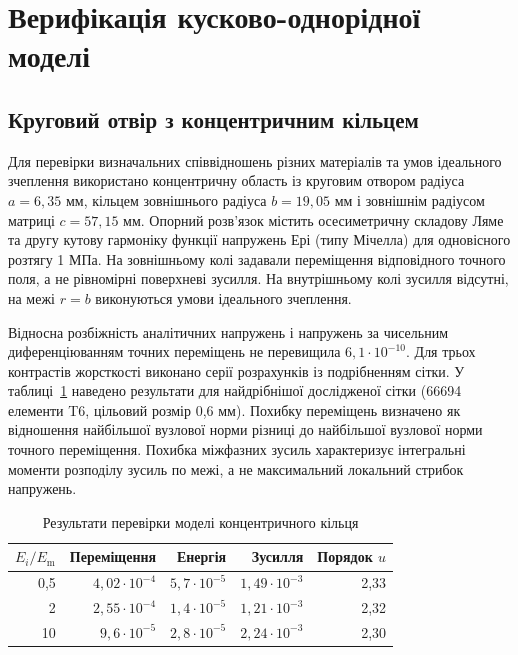 \section{Верифікація кусково-однорідної моделі}
\label{sec:ver-phase}

\subsection{Круговий отвір з концентричним кільцем}

Для перевірки визначальних співвідношень різних матеріалів та умов ідеального зчеплення використано концентричну область із круговим отвором радіуса $a=6{,}35$ мм, кільцем зовнішнього радіуса $b=19{,}05$ мм і зовнішнім радіусом матриці $c=57{,}15$ мм. Опорний розв'язок містить осесиметричну складову Ляме та другу кутову гармоніку функції напружень Ері (типу Мічелла) для одновісного розтягу 1 МПа. На зовнішньому колі задавали переміщення відповідного точного поля, а не рівномірні поверхневі зусилля. На внутрішньому колі зусилля відсутні, на межі $r=b$ виконуються умови ідеального зчеплення.

Відносна розбіжність аналітичних напружень і напружень за чисельним диференціюванням точних переміщень не перевищила $6{,}1\cdot10^{-10}$. Для трьох контрастів жорсткості виконано серії розрахунків із подрібненням сітки. У таблиці~\ref{tab:ver-coated} наведено результати для найдрібнішої дослідженої сітки (66694 елементи T6, цільовий розмір 0,6 мм). Похибку переміщень визначено як відношення найбільшої вузлової норми різниці до найбільшої вузлової норми точного переміщення. Похибка міжфазних зусиль характеризує інтегральні моменти розподілу зусиль по межі, а не максимальний локальний стрибок напружень.

\begin{table}[htbp]
 \centering
 \caption{Результати перевірки моделі концентричного кільця}
 \label{tab:ver-coated}
 \begin{tabular}{rrrrr}
 \toprule
 $E_i/E_{\mathrm m}$ & Переміщення & Енергія & Зусилля & Порядок $u$\\
 \midrule
 0,5 & $4,02\cdot10^{-4}$ & $5,7\cdot10^{-5}$ & $1,49\cdot10^{-3}$ & 2,33\\
 2 & $2,55\cdot10^{-4}$ & $1,4\cdot10^{-5}$ & $1,21\cdot10^{-3}$ & 2,32\\
 10 & $9,6\cdot10^{-5}$ & $2,8\cdot10^{-5}$ & $2,24\cdot10^{-3}$ & 2,30\\
 \bottomrule
 \end{tabular}
\end{table}

